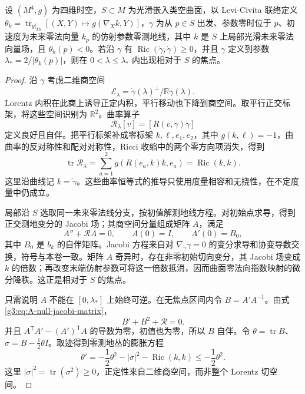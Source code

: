 \begin{proposition}\label{g3:prop:A-null-focusing}
	设 \((M^4,g)\) 为四维时空，\(S\subset M\) 为光滑嵌入类空曲面，以 Levi-Civita 联络定义 \(\theta_k=\operatorname{tr}_{g|_{TS}}[(X,Y)\mapsto g(\nabla_Xk,Y)]\)，\(\gamma\) 为从 \(p\in S\) 出发、参数零时位于 \(p\)、初速度为未来零法向量 \(k_p\) 的仿射参数零测地线，其中 \(k\) 是 \(S\) 上局部光滑未来零法向量场，且 \(\theta_k(p)<0\)。若沿 \(\gamma\) 有
	\(\operatorname{Ric}(\dot\gamma,\dot\gamma)\ge0\)，并且 \(\gamma\) 定义到参数
	\(\lambda_*=2/|\theta_k(p)|\)，则在 \(0<\lambda\le\lambda_*\) 内出现相对于 \(S\) 的焦点。
\end{proposition}
\begin{proof}
	沿 \(\gamma\) 考虑二维商空间
	\[
		\mathcal E_\lambda=
		\dot\gamma(\lambda)^\perp/\mathbb R\dot\gamma(\lambda).
	\]
	Lorentz 内积在此商上诱导正定内积，平行移动也下降到商空间。取平行正交标架，将这些空间识别为 \(\mathbb R^2\)。曲率算子
	\[
		\mathscr R_\lambda[v]=[R(v,\dot\gamma)\dot\gamma]
	\]
	定义良好且自伴。把平行标架补成零标架 \(k,\ell,e_1,e_2\)，其中 \(g(k,\ell)=-1\)，由曲率的反对称性和配对对称性，Ricci 收缩中的两个零方向项消失，得到
	\begin{equation}\label{g3:eq:A-screen-curvature-trace}
		\operatorname{tr}\mathscr R_\lambda
		=\sum_{a=1}^2 g(R(e_a,k)k,e_a)
		=\operatorname{Ric}(k,k).
	\end{equation}
	这里沿曲线记 \(k=\dot\gamma\)。这些曲率恒等式的推导只使用度量相容和无挠性，在不定度量中仍成立。

	局部沿 \(S\) 选取同一未来零法线分支，按初值解测地线方程。对初始点求导，得到正交测地变分的 Jacobi 场；其商空间分量组成矩阵 \(A\)，满足
	\begin{equation}\label{g3:eq:A-null-jacobi-matrix}
		A''+\mathscr R A=0,
		\qquad A(0)=I,
		\qquad A'(0)=B_0,
	\end{equation}
	其中 \(B_0\) 是 \(b_k\) 的自伴矩阵。Jacobi 方程来自对 \(\nabla_{\dot\gamma}\dot\gamma=0\) 的变分求导和协变导数交换，符号与本卷一致。矩阵 \(A\) 奇异时，存在非零初始切向变分，其 Jacobi 场变成 \(k\) 的倍数；再改变末端仿射参数可将这一倍数抵消，因而曲面零法向指数映射的微分降秩。这正是相对于 \(S\) 的焦点。

	只需说明 \(A\) 不能在 \([0,\lambda_*]\) 上始终可逆。在无焦点区间内令 \(B=A'A^{-1}\)。由式\eqref{g3:eq:A-null-jacobi-matrix}，
	\[
		B'+B^2+\mathscr R=0.
	\]
	并且 \(A^{\mathsf T}A'-(A')^{\mathsf T}A\) 的导数为零，初值也为零，所以 \(B\) 自伴。令
	\(\theta=\operatorname{tr}B\)、\(\sigma=B-\tfrac12\theta I\)。取迹得到零测地丛的膨胀方程
	\begin{equation}\label{g3:eq:A-null-expansion-equation}
		\theta'=-\frac12\theta^2-|\sigma|^2
		-\operatorname{Ric}(k,k)
		\le-\frac12\theta^2.
	\end{equation}
	这里 \(|\sigma|^2=\operatorname{tr}(\sigma^2)\ge0\)，正定性来自二维商空间，而非整个 Lorentz 切空间。


\end{proof}
